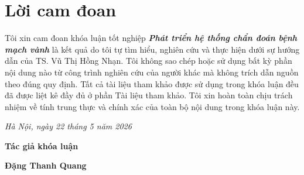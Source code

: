 \clearpage
{}

\chapter*{Lời cam đoan}

Tôi xin cam đoan khóa luận tốt nghiệp \textit{\textbf{Phát triển hệ thống chẩn đoán bệnh mạch vành}} là kết quả do tôi tự tìm hiểu, nghiên cứu và thực hiện dưới sự hướng dẫn của TS. Vũ Thị Hồng Nhạn. Tôi không sao chép hoặc sử dụng bất kỳ phần nội dung nào từ công trình nghiên cứu của người khác mà không trích dẫn nguồn theo đúng quy định. Tất cả tài liệu tham khảo được sử dụng trong khóa luận đều đã được liệt kê đầy đủ ở phần Tài liệu tham khảo. Tôi xin hoàn toàn chịu trách nhiệm về tính trung thực và chính xác của toàn bộ nội dung trong khóa luận này.

\vspace{1cm}
\hspace{7cm}\textit{Hà Nội, ngày 22 tháng 5 năm 2026}

\hspace{9.4cm}\textbf{Tác giả khóa luận}
\vspace{2.5cm}

\hspace{9.3cm}\textbf{Đặng Thanh Quang}


